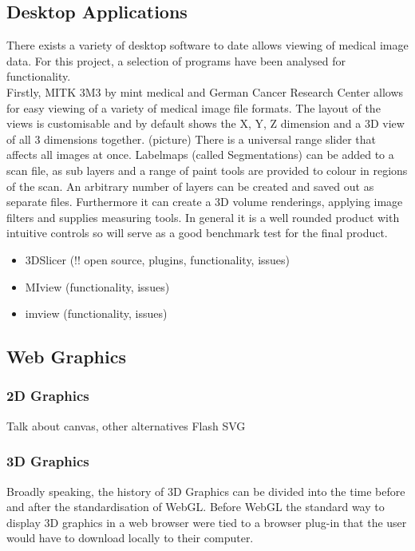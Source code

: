 \documentclass[a4paper,11pt,titlepage]{article}
\begin{document}
	


\subsection{Desktop Applications}

There exists a variety of desktop software to date allows viewing of medical image data. For this project, a selection of programs have been analysed for functionality.\\

     Firstly, MITK 3M3 by mint medical and German Cancer Research Center allows for easy viewing of a variety of medical image file formats. The layout of the views is customisable and by default shows the X, Y, Z dimension and a 3D view of all 3 dimensions together. (picture) There is a universal range slider that affects all images at once. Labelmaps (called Segmentations) can be added to a scan file, as sub layers and a range of paint tools are provided to colour in regions of the scan. An arbitrary number of layers can be created and saved out as separate files. 
     Furthermore it can create a 3D volume renderings, applying image filters and supplies measuring tools. In general it is a well rounded product with intuitive controls so will serve as a good benchmark test for the final product.
\begin{itemize}
\item 3DSlicer (!! open source, plugins, functionality, issues)
\item MIview (functionality, issues)
\item imview (functionality, issues)
\end{itemize}


\subsection{Web Graphics}

\subsubsection{2D Graphics}

Talk about canvas, other alternatives
Flash
SVG


\subsubsection{3D Graphics}

Broadly speaking, the history of 3D Graphics can be divided into the time before and after the standardisation of WebGL. Before WebGL the standard way to display 3D graphics in a web browser were tied to a browser plug-in that the user would have to download locally to their computer.
\end{document}
